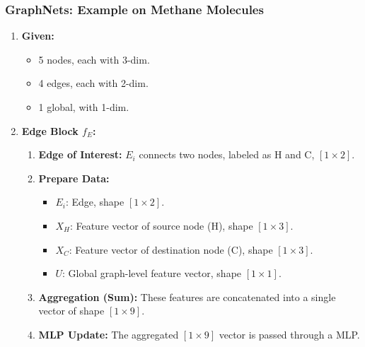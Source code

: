 \subsubsection{GraphNets: Example on Methane Molecules}
\begin{example}
    \begin{enumerate}
        \item \textbf{Given:}
        \begin{itemize}
            \item 5 nodes, each with 3-dim. 
            \item 4 edges, each with 2-dim.
            \item 1 global, with 1-dim.
        \end{itemize}
        \item \textbf{Edge Block $f_E$:}
        \begin{enumerate}
            \item \textbf{Edge of Interest:} $E_i$ connects two nodes, labeled as H and C, $[1 \times 2]$.
        
            \item \textbf{Prepare Data:} 
            \begin{itemize}
                \item $E_i$: Edge, shape $[1 \times 2]$.
                \item $X_H$: Feature vector of source node (H), shape $[1 \times 3]$.
                \item $X_C$: Feature vector of destination node (C), shape $[1 \times 3]$.
                \item $U$: Global graph-level feature vector, shape $[1 \times 1]$.
            \end{itemize}

            \item \textbf{Aggregation (Sum):} These features are concatenated into a single vector of shape $[1 \times 9]$.
            
            \item \textbf{MLP Update:} The aggregated $[1 \times 9]$ vector is passed through a MLP. 


\end{enumerate}
\end{enumerate}
\end{example}
